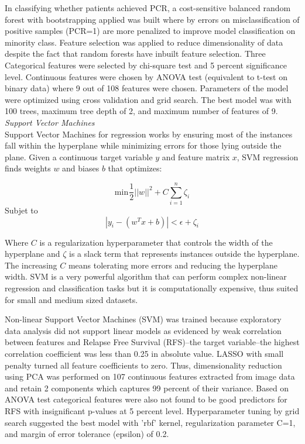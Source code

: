 \documentclass{article}
\begin{document}
In classifying whether patients achieved PCR, a cost-sensitive balanced random forest with bootstrapping applied was built where by errors on misclassification of positive samples (PCR=1) are more penalized to improve model classification on minority class. Feature selection was applied to reduce dimensionality of data despite the fact that random forests have inbuilt feature selection. Three Categorical features were selected by chi-square test and  5 percent significance level. Continuous features were chosen by ANOVA test (equivalent to t-test on binary data) where 9 out of 108 features were chosen. Parameters of the model were optimized using cross validation and grid search. The best model was with 100 trees, maximum tree depth of 2, and maximum number of features of 9. \\

\noindent\textit{Support Vector Machines}\\
Support Vector Machines for regression works by ensuring most of the instances fall within the hyperplane while minimizing errors for those lying outside the plane. Given a continuous target variable $y$ and feature matrix $x$, SVM regression finds weights $w$ and biases $b$ that optimizes:

\begin{equation}
	\label{eq:svm}
	\text{min}\hspace{1pt}  \frac{1}{2}||w||^{2} +C\sum_{i=1}^{n}\zeta_i
\end{equation}
Subjet to 
\begin{equation*}
	|y_i - (w^{T}x + b)|< \epsilon + \zeta_i
\end{equation*}

Where $C$ is a regularization hyperparameter that controls the width of the hyperplane and $\zeta$ is a slack term that represents instances outside the hyperplane. The increasing $C$ means tolerating more errors and reducing the hyperplane width. SVM is a very powerful algorithm that can perform complex non-linear regression and classification tasks but it is computationally expensive, thus suited for small and medium sized datasets.

Non-linear Support Vector Machines (SVM) was trained because exploratory data analysis did not support linear models as evidenced by weak correlation between features and Relapse Free Survival (RFS)--the target variable--the highest correlation coefficient was less than 0.25 in absolute value. LASSO with small penalty turned all feature coefficients to zero. Thus, dimensionality reduction using PCA was performed on 107 continuous features extracted from image data and retain 2 components which captures 99 percent of their variance. Based on ANOVA test categorical features were also not found to be good predictors for RFS with insignificant p-values at 5 percent level. Hyperparameter tuning by grid search suggested the best model with 'rbf' kernel, regularization parameter C=1, and margin of error tolerance (epsilon) of 0.2.
\end{document}
